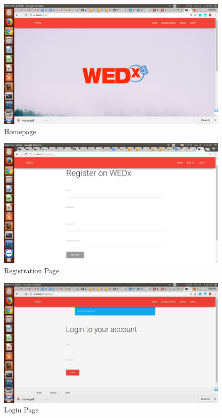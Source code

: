 \documentclass[12pt]{report}
\begin{document}
\begin{figure}[!htb]
    \centering
    \includegraphics[width=1\textwidth]{sc-1.png}
    \caption{Homepage}
    \label{fig:Homepage}
\end{figure}

\begin{figure}[!htb]
    \centering
    \includegraphics[width=1\textwidth]{sc-2.png}
    \caption{Registration Page}
    \label{fig:Registration Page}
\end{figure}


\begin{figure}[!htb]
    \centering
    \includegraphics[width=1\textwidth]{sc-25.png}
    \caption{Login Page}
    \label{fig:Login Page}
\end{figure}
\end{document}
